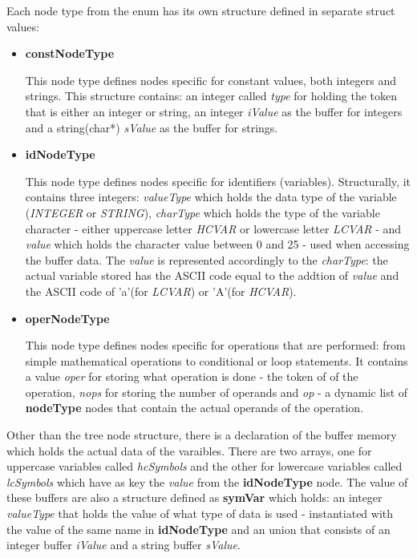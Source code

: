 \documentclass[12pt,a4paper,twoside]{report}
\begin{document}
Each node type from the enum has its own structure defined in separate struct values:
\begin{itemize}
	\item \textbf{constNodeType}
	
	This node type defines nodes specific for constant values, both integers and strings. This structure contains: an integer called \textit{type} for holding the token that is either an integer or string, an integer \textit{iValue} as the buffer for integers and a string(char*) \textit{sValue} as the buffer for strings.
	
	\item \textbf{idNodeType}
	
	This node type defines nodes specific for identifiers (variables). Structurally, it contains three integers: \textit{valueType} which holds the data type of the variable (\textit{INTEGER} or \textit{STRING}), \textit{charType} which holds the type of the variable character - either uppercase letter \textit{HCVAR} or lowercase letter \textit{LCVAR} - and \textit{value} which holds the character value between 0 and 25 - used when accessing the buffer data. The \textit{value} is represented accordingly to the \textit{charType}: the actual variable stored has the ASCII code equal to the addtion of \textit{value} and the ASCII code of 'a'(for \textit{LCVAR}) or 'A'(for \textit{HCVAR}).
	
	\item \textbf{operNodeType}
	
	This node type defines nodes specific for operations that are performed: from simple mathematical operations to conditional or loop statements. It contains a value \textit{oper} for storing what operation is done - the token of of the operation, \textit{nops} for storing the number of operands and \textit{op} - a dynamic list of \textbf{nodeType} nodes that contain the actual operands of the operation.
\end{itemize}

Other than the tree node structure, there is a declaration of the buffer memory which holds the actual data of the varaibles. There are two arrays, one for uppercase variables called \textit{hcSymbols} and the other for lowercase variables called \textit{lcSymbols} which have as key the \textit{value} from the \textbf{idNodeType} node. The value of these buffers are also a structure defined as \textbf{symVar} which holds: an integer \textit{valueType} that holds the value of what type of data is used - instantiated with the value of the same name in \textbf{idNodeType} and an union that consists of an integer buffer \textit{iValue} and a string buffer \textit{sValue}.
\end{document}
